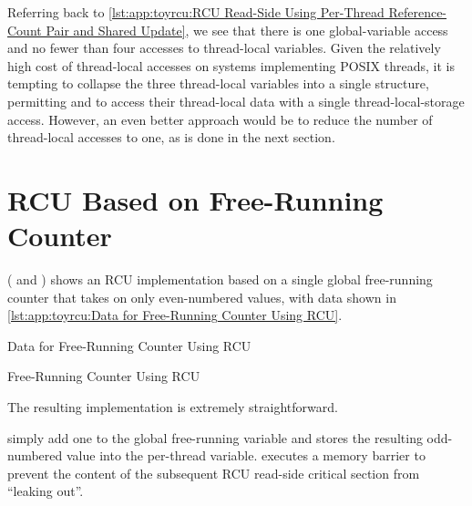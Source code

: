 Referring back to
\cref{lst:app:toyrcu:RCU Read-Side Using Per-Thread Reference-Count Pair and Shared Update},
we see that there is one global-variable access and no fewer than four
accesses to thread-local variables.
Given the relatively high cost of thread-local accesses on systems
implementing POSIX threads, it is tempting to collapse the three
thread-local variables into a single structure, permitting
 and  to access their
thread-local data with a single thread-local-storage access.
However, an even better approach would be to reduce the number of
thread-local accesses to one, as is done in the next section.

\section{RCU Based on Free-Running Counter}
\label{sec:app:toyrcu:RCU Based on Free-Running Counter}

( and )
shows an RCU implementation based on a single global free-running counter
that takes on only even-numbered values, with data shown in
\cref{lst:app:toyrcu:Data for Free-Running Counter Using RCU}.

\begin{listing}

\caption{Data for Free-Running Counter Using RCU}
\label{lst:app:toyrcu:Data for Free-Running Counter Using RCU}
\end{listing}

\begin{listing}
\vspace*{-11pt}
\caption{Free-Running Counter Using RCU}
\label{lst:app:toyrcu:Free-Running Counter Using RCU}
\end{listing}

The resulting  implementation is extremely
straightforward.
\begin{fcvref}
 simply
add one to the global free-running 
variable and stores the resulting odd-numbered value into the
 per-thread variable.
 executes a memory barrier to prevent the content of the
subsequent RCU read-side critical section from ``leaking out''.
\end{fcvref}

